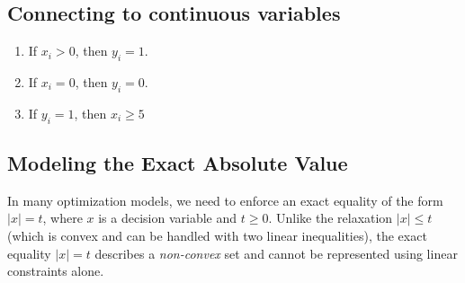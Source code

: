 %
\subsection{Connecting to continuous variables}
%
%
\begin{enumerate}
\item If $x_i > 0$, then $y_i = 1$.
\begin{equation}
\end{equation}
\item If $x_i = 0$, then $y_i = 0$.\\
\begin{equation}
\end{equation}
\item If $y_i = 1$, then $x_i \geq 5$
\begin{equation}
\end{equation}
\end{enumerate}

\subsection{Modeling the Exact Absolute Value}

In many optimization models, we need to enforce an exact equality of the form $|x| = t$, where $x$ is a decision variable and $t \geq 0$.  Unlike the relaxation $|x| \leq t$ (which is convex and can be handled with two linear inequalities), the exact equality $|x| = t$ describes a \emph{non-convex} set and cannot be represented using linear constraints alone.

